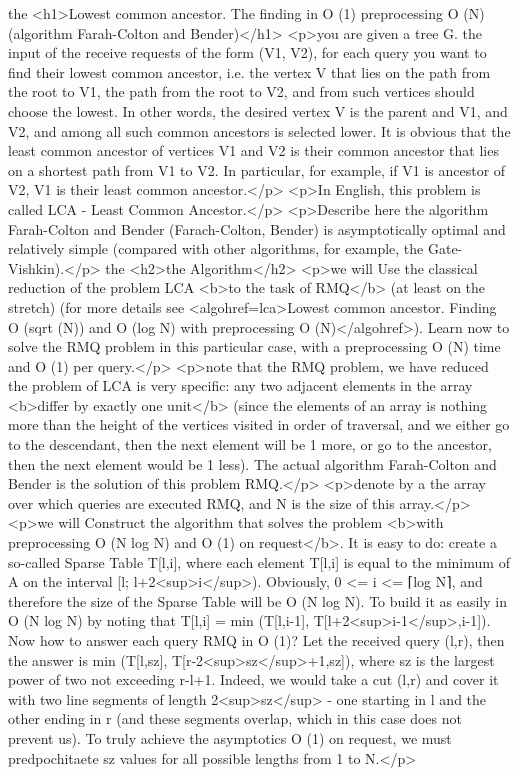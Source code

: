 the <h1>Lowest common ancestor. The finding in O (1) preprocessing O (N) (algorithm Farah-Colton and Bender)</h1>
<p>you are given a tree G. the input of the receive requests of the form (V1, V2), for each query you want to find their lowest common ancestor, i.e. the vertex V that lies on the path from the root to V1, the path from the root to V2, and from such vertices should choose the lowest. In other words, the desired vertex V is the parent and V1, and V2, and among all such common ancestors is selected lower. It is obvious that the least common ancestor of vertices V1 and V2 is their common ancestor that lies on a shortest path from V1 to V2. In particular, for example, if V1 is ancestor of V2, V1 is their least common ancestor.</p>
<p>In English, this problem is called LCA - Least Common Ancestor.</p>
<p>Describe here the algorithm Farah-Colton and Bender (Farach-Colton, Bender) is asymptotically optimal and relatively simple (compared with other algorithms, for example, the Gate-Vishkin).</p>
the <h2>the Algorithm</h2>
<p>we will Use the classical reduction of the problem LCA <b>to the task of RMQ</b> (at least on the stretch) (for more details see <algohref=lca>Lowest common ancestor. Finding O (sqrt (N)) and O (log N) with preprocessing O (N)</algohref>). Learn now to solve the RMQ problem in this particular case, with a preprocessing O (N) time and O (1) per query.</p>
<p>note that the RMQ problem, we have reduced the problem of LCA is very specific: any two adjacent elements in the array <b>differ by exactly one unit</b> (since the elements of an array is nothing more than the height of the vertices visited in order of traversal, and we either go to the descendant, then the next element will be 1 more, or go to the ancestor, then the next element would be 1 less). The actual algorithm Farah-Colton and Bender is the solution of this problem RMQ.</p>
<p>denote by a the array over which queries are executed RMQ, and N is the size of this array.</p>
<p>we will Construct the algorithm that solves the problem <b>with preprocessing O (N log N) and O (1) on request</b>. It is easy to do: create a so-called Sparse Table T[l,i], where each element T[l,i] is equal to the minimum of A on the interval [l; l+2<sup>i</sup>). Obviously, 0 <= i <= ⌈log N⌉, and therefore the size of the Sparse Table will be O (N log N). To build it as easily in O (N log N) by noting that T[l,i] = min (T[l,i-1], T[l+2<sup>i-1</sup>,i-1]). Now how to answer each query RMQ in O (1)? Let the received query (l,r), then the answer is min (T[l,sz], T[r-2<sup>sz</sup>+1,sz]), where sz is the largest power of two not exceeding r-l+1. Indeed, we would take a cut (l,r) and cover it with two line segments of length 2<sup>sz</sup> - one starting in l and the other ending in r (and these segments overlap, which in this case does not prevent us). To truly achieve the asymptotics O (1) on request, we must predpochitaete sz values for all possible lengths from 1 to N.</p>
